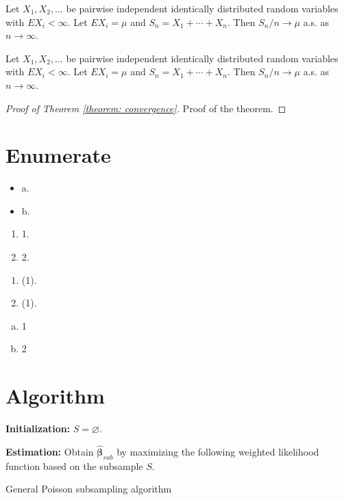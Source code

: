 \begin{corollary}\label{corollary: convergence}
    Let $X_1,X_2,\dots$ be pairwise independent identically distributed random variables with $EX_i<\infty$. Let $EX_i=\mu$ and $S_n=X_1+\cdots+X_n$. Then $S_n/n\rightarrow\mu$ a.s. as $n\rightarrow\infty$.
\end{corollary}

\begin{example}\label{example: convergence}
    Let $X_1,X_2,\dots$ be pairwise independent identically distributed random variables with $EX_i<\infty$. Let $EX_i=\mu$ and $S_n=X_1+\cdots+X_n$. Then $S_n/n\rightarrow\mu$ a.s. as $n\rightarrow\infty$.
\end{example}

\begin{proof}[Proof of Theorem \ref{theorem: convergence}]
    Proof of the theorem.
\end{proof}

\section{Enumerate}

\begin{itemize}
    \item a.
    \item b.
\end{itemize}

\begin{enumerate}
    \item 1.
    \item 2.
\end{enumerate}

\begin{enumerate}[(1)]
    \item (1).
    \item (1).
\end{enumerate}

\begin{enumerate}[(a)]
    \item 1
    \item 2
\end{enumerate}

\section{Algorithm}
\begin{algorithm}[htb]
    \SetAlgoLined
    {\bf Initialization:} $S=\varnothing$.
        
    {\bf Estimation:} Obtain  $\hat{\bm\beta}_{sub}$ by maximizing the following weighted likelihood function  based on the subsample $S$.
    \caption{General Poisson subsampling algorithm}
    \label{algorithm: poisson subsampling}
\end{algorithm}

